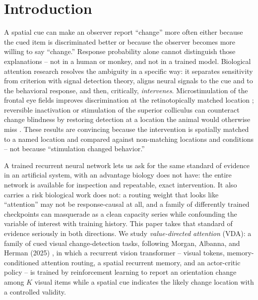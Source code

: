 \documentclass[10pt]{article}
\begin{document}
\section{Introduction}
A spatial cue can make an observer report ``change'' more often either because the cued item is discriminated better or because the observer becomes more willing to say ``change.'' Response probability alone cannot distinguish those explanations -- not in a human or monkey, and not in a trained model. Biological attention research resolves the ambiguity in a specific way: it separates sensitivity from criterion with signal detection theory, aligns neural signals to the cue and to the behavioral response, and then, critically, \emph{intervenes}. Microstimulation of the frontal eye fields improves discrimination at the retinotopically matched location \cite{moore2003}; reversible inactivation or stimulation of the superior colliculus can counteract change blindness by restoring detection at a location the animal would otherwise miss \cite{cavanaugh2004}. These results are convincing because the intervention is spatially matched to a named location and compared against non-matching locations and conditions -- not because ``stimulation changed behavior.''

A trained recurrent neural network lets us ask for the same standard of evidence in an artificial system, with an advantage biology does not have: the entire network is available for inspection and repeatable, exact intervention. It also carries a risk biological work does not: a routing weight that looks like ``attention'' may not be response-causal at all, and a family of differently trained checkpoints can masquerade as a clean capacity series while confounding the variable of interest with training history. This paper takes that standard of evidence seriously in both directions. We study \emph{value-directed attention} (VDA): a family of cued visual change-detection tasks, following Morgan, Albanna, and Herman (2025) \cite{mah2025}, in which a recurrent vision transformer -- visual tokens, memory-conditioned attention routing, a spatial recurrent memory, and an actor-critic policy -- is trained by reinforcement learning to report an orientation change among $K$ visual items while a spatial cue indicates the likely change location with a controlled validity.
\end{document}
